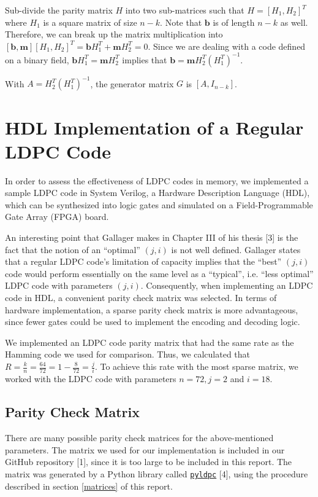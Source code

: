 \documentclass[conference]{IEEEtran}
\begin{document}
Sub-divide the parity matrix $H$ into two sub-matrices such that $H = [H_1, H_2]^T$ where $H_1$ is a square matrix of size $n-k$.
    Note that $\textbf{b}$ is of length $n-k$ as well.
    Therefore, we can break up the matrix
    multiplication into $[\textbf{b}, \textbf{m}][H_1, H_2]^T = \textbf{b}H_1^T + \textbf{m}H_2^T = 0$.
Since we are dealing with a code defined on a binary field, $\textbf{b}H_1^T = \textbf{m}H_2^T$ implies that $\textbf{b}= \textbf{m}H_2^T(H_1^T)^{-1}$.

    With $A = H_2^T(H_1^T)^{-1}$, the generator matrix $G$ is $[A, I_{n-k}]$.

\section{HDL Implementation of a Regular LDPC Code}
In order to assess the effectiveness of LDPC codes in memory, we implemented a sample LDPC code in System Verilog, a Hardware Description Language (HDL), which can be synthesized into logic gates and simulated on a Field-Programmable Gate Array (FPGA) board.

An interesting point that Gallager makes in Chapter III of his thesis [3] is the fact that the notion of an ``optimal'' $(j,i)$ is not well defined.
Gallager states that a regular LDPC code's limitation of capacity implies that the ``best'' $(j,i)$ code would perform essentially on the same level as a ``typical'', i.e. ``less optimal'' LDPC code with parameters $(j,i)$.
Consequently, when implementing an LDPC code in HDL, a convenient parity check matrix was selected.
In terms of hardware implementation, a sparse parity check matrix is more advantageous, since fewer gates could be used to implement the encoding and decoding logic.

We implemented an LDPC code parity matrix that had the same rate as 
the Hamming code we used for comparison.
Thus, we calculated that $R=\frac{k}{n}=\frac{64}{72}=1-\frac{8}{72} = \frac{j}{i}$.
To achieve this rate with the most sparse matrix, we worked with the LDPC code with parameters $n=72, j=2$ and $i=18$.

\subsection{Parity Check Matrix}
There are many possible parity check matrices for the above-mentioned parameters. The matrix we used for our implementation is included in our GitHub repository [1], %
since it is too large to be included in this report. The matrix was generated by a Python library called \href{https://hichamjanati.github.io/pyldpc/}{\texttt{pyldpc}} [4], using the procedure described in section \ref{matrices} of this report.
\end{document}
